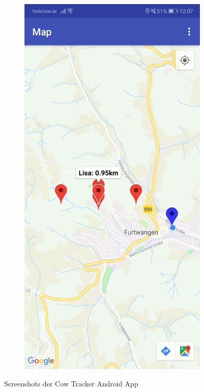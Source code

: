\begin{figure}[!ht]
\begin{subfigure}{0.49\linewidth}
		\caption{ }
		\label{subfig:cowtracker_login}
	\end{subfigure}
	\begin{subfigure}{0.49\linewidth}
		\includegraphics[width=1\linewidth]{Pictures/Screenshot_Map.jpg}
		\caption{ }
		\label{subfig:cowtracker_map}
	\end{subfigure}	
	\caption{Screenshots der Cow Tracker Android App}
	\label{fig:cowtracker}
\end{figure}

